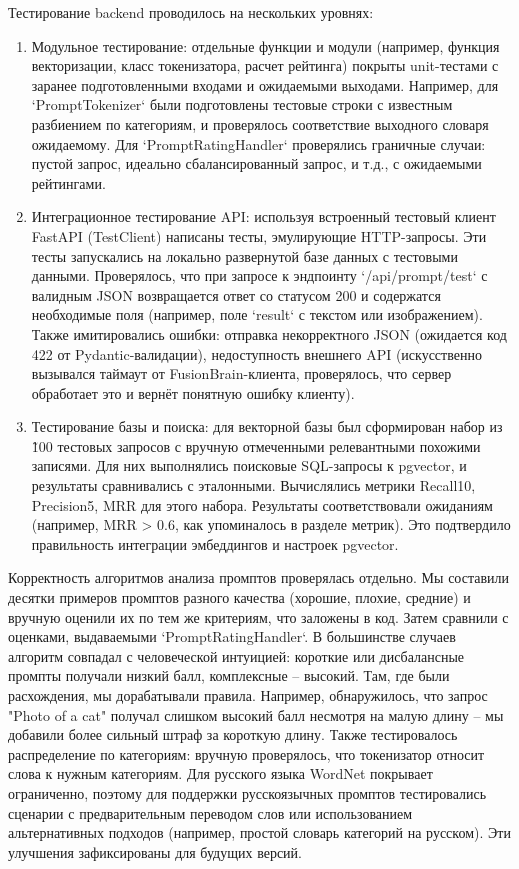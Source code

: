 Тестирование backend проводилось на нескольких уровнях:
\begin{enumerate}[label=\arabic*.] 
\item Модульное тестирование: отдельные функции и модули (например, функция векторизации, класс токенизатора, расчет рейтинга) покрыты unit-тестами с заранее подготовленными входами и ожидаемыми выходами. Например, для `PromptTokenizer` были подготовлены тестовые строки с известным разбиением по категориям, и проверялось соответствие выходного словаря ожидаемому. Для `PromptRatingHandler` проверялись граничные случаи: пустой запрос, идеально сбалансированный запрос, и т.д., с ожидаемыми рейтингами.
\item Интеграционное тестирование API: используя встроенный тестовый клиент FastAPI (TestClient) написаны тесты, эмулирующие HTTP-запросы. Эти тесты запускались на локально развернутой базе данных с тестовыми данными. Проверялось, что при запросе к эндпоинту `/api/prompt/test` с валидным JSON возвращается ответ со статусом 200 и содержатся необходимые поля (например, поле `result` с текстом или изображением). Также имитировались ошибки: отправка некорректного JSON (ожидается код 422 от Pydantic-валидации), недоступность внешнего API (искусственно вызывался таймаут от FusionBrain-клиента, проверялось, что сервер обработает это и вернёт понятную ошибку клиенту).
\item Тестирование базы и поиска: для векторной базы был сформирован набор из \~100 тестовых запросов с вручную отмеченными релевантными похожими записями. Для них выполнялись поисковые SQL-запросы к pgvector, и результаты сравнивались с эталонными. Вычислялись метрики Recall\@10, Precision\@5, MRR для этого набора. Результаты соответствовали ожиданиям (например, MRR > 0.6, как упоминалось в разделе метрик). Это подтвердило правильность интеграции эмбеддингов и настроек pgvector.
\end{enumerate}

Корректность алгоритмов анализа промптов проверялась отдельно. Мы составили десятки примеров промптов разного качества (хорошие, плохие, средние) и вручную оценили их по тем же критериям, что заложены в код. Затем сравнили с оценками, выдаваемыми `PromptRatingHandler`. В большинстве случаев алгоритм совпадал с человеческой интуицией: короткие или дисбалансные промпты получали низкий балл, комплексные – высокий. Там, где были расхождения, мы дорабатывали правила. Например, обнаружилось, что запрос "Photo of a cat" получал слишком высокий балл несмотря на малую длину – мы добавили более сильный штраф за короткую длину. Также тестировалось распределение по категориям: вручную проверялось, что токенизатор относит слова к нужным категориям. Для русского языка WordNet покрывает ограниченно, поэтому для поддержки русскоязычных промптов тестировались сценарии с предварительным переводом слов или использованием альтернативных подходов (например, простой словарь категорий на русском). Эти улучшения зафиксированы для будущих версий.

